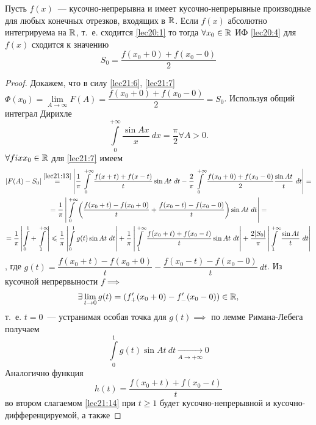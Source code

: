 \documentclass[../../main.tex]{subfiles}
\begin{document}
\begin{thm}[о сходимости ИФ]
	Пусть $ f(x) $~--- кусочно-непрерывна и имеет кусочно-непрерывные
	производные для любых конечных отрезков, входящих в $ \mathbb{R} $.
	Если $ f(x) $ абсолютно интегрируема на $ \mathbb{R} $, т.~е.
	сходится \eqref{lec20:1} то тогда 
	$ \forall x_0 \in \mathbb{R} $ ИФ \eqref{lec20:4} для $ f(x) $ сходится
	к значению 
	\begin{equation}
	\label{lec21:13}
	S_0 = \dfrac{f(x_0 + 0) + f(x_0 - 0)}{2}
	\end{equation}
\end{thm}
\begin{proof}
	Докажем, что в силу \eqref{lec21:6}, \eqref{lec21:7}
	$ \Phi(x_0) = \lim\limits_{A \to \infty} F(A) = 
	\dfrac{f(x_0 + 0) + f(x_0 - 0)}{2} = S_0 $.
	Используя общий интеграл Дирихле 
	\[
	\int\limits_{0}^{+\infty} \dfrac{\sin Ax}{x}\ dx = \dfrac{\pi}{2} \forall A > 0.
	\]
	$ \forall fix x_0 \in \mathbb{R} $ для \eqref{lec21:7} имеем
	\begin{equation}
	\label{lec21:14}
	\begin{gathered}
	|F(A) - S_0| \stackrel{\eqref{lec21:13}}{=}
	\left|
	\dfrac{1}{\pi}
	\int\limits_{0}^{+\infty}
	\dfrac{f(x + t) + f(x - t)}{t} \sin At\ dt - 
	\dfrac{2}{\pi} \int\limits_{0}^{+\infty} 
	\dfrac{f(x_0 + 0) + f(x_0 - 0)}{2} \dfrac{\sin At}{t}\ dt
	\right| = \\ =
	\dfrac{1}{\pi} \left|
	\int\limits_{0}^{+\infty} \left(
	\dfrac{f(x_0 + t) - f(x_0 + 0)}{t} +
	\dfrac{f(x_0 - t) - f(x_0 - 0) }{t}
	\right)
	\sin At\ dt
	\right| = \\ = \dfrac{1}{\pi}
	\left|
	\int\limits_{0}^{1} + \int\limits_{1}^{+\infty}
	\right| \leqslant \dfrac{1}{\pi}
	\left|
	\int\limits_{0}^{1} g(t) \sin At\ dt
	\right| + \dfrac{1}{\pi}
	\left|
	\int\limits_{1}^{+\infty} 
	\dfrac{f(x_0 + t) + f(x_0 - t)}{t} \sin At\ dt
	\right| + \dfrac{2|S_0|}{\pi}
	\left|
	\int\limits_{1}^{+\infty} \dfrac{\sin At}{t}\ dt
	\right|
	\end{gathered}
	\end{equation}, где $ g(t) = \dfrac{f(x_0 + t) - f(x_0 + 0)}{t} - 
	\dfrac{f(x_0 - t) - f(x_0 - 0)}{t}\ dt $.
	Из кусочной непрервыности $ f \implies $
	\[
	\exists \lim\limits_{t \to 0} g(t) =
	(f_+'(x_0 + 0) - f_-'(x_0 - 0)) \in \mathbb{R},
	\] т.~е. $ t = 0 $~--- устранимая особая точка для $ g(t) \implies $
	по лемме Римана-Лебега получаем
	\[
	\int\limits_{0}^{1} g(t) \sin At\ dt
	\underset{A \to +\infty}{\to} 0
	\]
	Аналогично функция \[
	h(t) = \dfrac{f(x_0 + t) + f(x_0 - t)}{t}
	\] во втором слагаемом \eqref{lec21:14} при 
	$ t \geq 1 $ будет кусочно-непрерывной и кусочно-дифференцируемой, а также

\end{proof}
\end{document}

